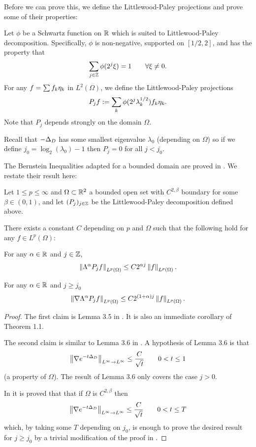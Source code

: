 Before we can prove this, we define the Littlewood-Paley projections and prove some of their properties:

Let $\phi$ be a Schwartz function on $\mathbb{R}$ which is suited to Littlewood-Paley decomposition.  Specifically, $\phi$ is non-negative, supported on $[1/2,2]$, and has the property that
\[ \sum_{j \in \mathbb{Z}} \phi(2^j \xi) = 1 \qquad \forall \xi \neq 0. \]
For any $f = \sum f_k \eta_{k}$ in $L^2(\Omega)$, we define the Littlewood-Paley projections
\[ P_j f := \sum_k \phi(2^j \lambda_k^{1/2}) f_k \eta_{k}. \]
Note that $P_j$ depends strongly on the domain $\Omega$.  

Recall that $-\Delta_D$ has some smallest eigenvalue $\lambda_0$ (depending on $\Omega$) so if we define $j_0 = \log_2(\lambda_0)-1$ then $P_j = 0$ for all $j < j_0$.

The Bernstein Inequalities adapted for a bounded domain are proved in \cite{IMT.bilinear}.  We restate their result here:
\begin{lemma} \label{thm:IMT stuff}
Let $1 \leq p \leq \infty$ and $\Omega \subset \mathbb{R}^2$ a bounded open set with $C^{2,\beta}$ boundary for some $\beta \in (0,1)$, and let $(P_j)_{j \in \mathbb{Z}}$ be the Littlewood-Paley decomposition defined above.  

There exists a constant $C$ depending on $p$ and $\Omega$ such that the following hold for any $f \in L^p(\Omega)$:

For any $\alpha \in \mathbb{R}$ and $j \in \mathbb{Z}$, 
\[ \left\lVert\Lambda^\alpha P_j f\right\rVert_{L^p(\Omega)} \leq C 2^{\alpha j} \left\lVert f\right\rVert_{L^p(\Omega)}. \]

For any $\alpha \in \mathbb{R}$ and $j \geq j_0$
\[ \left\lVert\nabla \Lambda^\alpha P_j f\right\rVert_{L^p(\Omega)} \leq C 2^{(1+\alpha) j} \left\lVert f\right\rVert_{L^p(\Omega)}. \]
\end{lemma}

\begin{proof}
The first claim is Lemma 3.5 in \cite{IMT.bilinear}.  It is also an immediate corollary of \cite{IMT.schrodinger} Theorem 1.1.  

The second claim is similar to Lemma 3.6 in \cite{IMT.bilinear}.  A hypothesis of Lemma 3.6 is that
\[ \left\lVert\nabla e^{-t\Delta_D}\right\rVert_{L^\infty \to L^\infty} \leq \frac{C}{\sqrt{t}} \qquad 0 < t \leq 1 \]
(a property of $\Omega$).  The result of Lemma 3.6 only covers the case $j > 0$.  

In \cite{FMP} it is proved that that if $\Omega$ is $C^{2,\beta}$ then
\[ \left\lVert\nabla e^{-t\Delta_D}\right\rVert_{L^\infty \to L^\infty} \leq \frac{C}{\sqrt{t}} \qquad 0 < t \leq T \]
which, by taking some $T$ depending on $j_0$, is enough to prove the desired result for $j \geq j_0$ by a trivial modification of the proof in \cite{IMT.bilinear}.  
\end{proof}

